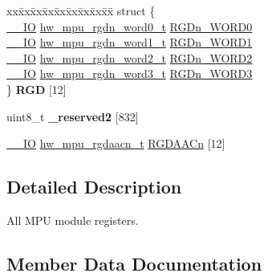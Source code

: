 \begin{DoxyCompactItemize}
\item 
\begin{tabbing}
xx\=xx\=xx\=xx\=xx\=xx\=xx\=xx\=xx\=\kill
struct \{\\
\>\hyperlink{core__sc300_8h_aec43007d9998a0a0e01faede4133d6be}{\_\_IO} \hyperlink{union__hw__mpu__rgdn__word0}{hw\_mpu\_rgdn\_word0\_t} \hyperlink{struct__hw__mpu_a96f0637c49cc1d527b20c5df9e7e5ddc}{RGDn\_WORD0}\\
\>\hyperlink{core__sc300_8h_aec43007d9998a0a0e01faede4133d6be}{\_\_IO} \hyperlink{union__hw__mpu__rgdn__word1}{hw\_mpu\_rgdn\_word1\_t} \hyperlink{struct__hw__mpu_ac8a281f61add48f8d9a2fd1f4ecd9b30}{RGDn\_WORD1}\\
\>\hyperlink{core__sc300_8h_aec43007d9998a0a0e01faede4133d6be}{\_\_IO} \hyperlink{union__hw__mpu__rgdn__word2}{hw\_mpu\_rgdn\_word2\_t} \hyperlink{struct__hw__mpu_aaa2c4a17d80d517dec17fc3170859384}{RGDn\_WORD2}\\
\>\hyperlink{core__sc300_8h_aec43007d9998a0a0e01faede4133d6be}{\_\_IO} \hyperlink{union__hw__mpu__rgdn__word3}{hw\_mpu\_rgdn\_word3\_t} \hyperlink{struct__hw__mpu_a49a820a8d0997b275056ced0bfc1843e}{RGDn\_WORD3}\\
\} {\bfseries RGD} \mbox{[}12\mbox{]}\hypertarget{struct__hw__mpu_aacb575dda4ef4b40948830a69a836fb5}{}\label{struct__hw__mpu_aacb575dda4ef4b40948830a69a836fb5}
\\

\end{tabbing}\item 
uint8\+\_\+t {\bfseries \+\_\+reserved2} \mbox{[}832\mbox{]}\hypertarget{struct__hw__mpu_aa8aeb63a82dc8569c33ff1c448ce94de}{}\label{struct__hw__mpu_aa8aeb63a82dc8569c33ff1c448ce94de}

\item 
\hyperlink{core__sc300_8h_aec43007d9998a0a0e01faede4133d6be}{\+\_\+\+\_\+\+IO} \hyperlink{union__hw__mpu__rgdaacn}{hw\+\_\+mpu\+\_\+rgdaacn\+\_\+t} \hyperlink{struct__hw__mpu_a249eb31334ca0ca19e0abd3fe04215e2}{R\+G\+D\+A\+A\+Cn} \mbox{[}12\mbox{]}
\end{DoxyCompactItemize}


\subsection{Detailed Description}
All M\+PU module registers. 

\subsection{Member Data Documentation}
